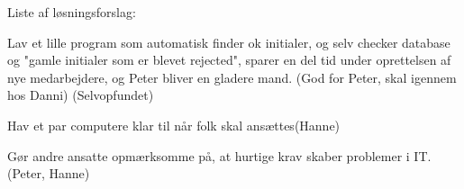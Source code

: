 

Liste af løsningsforslag:

Lav et lille program som automatisk finder ok initialer, og selv checker database og "gamle initialer som er blevet rejected", sparer en del tid under oprettelsen af nye medarbejdere, og Peter bliver en gladere mand. (God for Peter, skal igennem hos Danni) (Selvopfundet)

Hav et par computere klar til når folk skal ansættes(Hanne)

Gør andre ansatte opmærksomme på, at hurtige krav skaber problemer i IT. (Peter, Hanne)